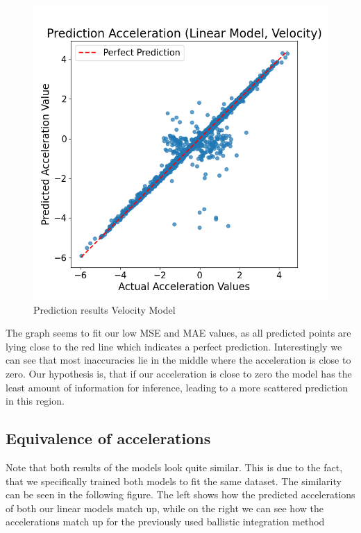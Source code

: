 \begin{figure}[h]
\begin{minipage}[b]{0.45\columnwidth}
        \includegraphics[width=\columnwidth]{images/figures/Prediction Acceleration (Linear Model, Velocity).png}
        \caption{Prediction results Velocity Model}
        \label{fig:prediciton_acceleration_velocity}
    \end{minipage}
\end{figure}

The graph seems to fit our low MSE and MAE values, as all predicted points are lying close to the red line which indicates
a perfect prediction.
Interestingly we can see that most inaccuracies lie in the middle where the acceleration is close to zero.
Our hypothesis is, that if our acceleration is close to zero the model has the least amount of information for inference, leading
to a more scattered prediction in this region.

\subsection{Equivalence of accelerations}

Note that both results of the models look quite similar. 
This is due to the fact, that we specifically trained both models to fit the same dataset. 
The similarity can be seen in the following figure.
The left shows how the predicted accelerations of both our linear models match up, while on the right we can see how the 
accelerations match up for the previously used ballistic integration method

